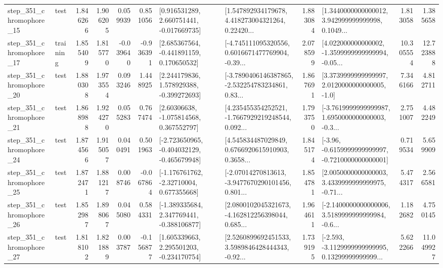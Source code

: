 \begin{tabular}{llrrrrllrlrr}
  step\_351\_chromophore\_15 &      test &      1.846266 &    1.906205 &      0.059939 &  0.851056 &    [0.916531289, 2.660751441, -0.017669735] &  [1.547892934179678, 4.418273004321264, 0.22420... &       1.883084 &  [1.3440000000000012, 3.942999999999998, 0.1049... &            1.813058 &          1.385658 \\
  step\_351\_chromophore\_17 &  training &      1.855409 &    1.815770 &     -0.039640 & -0.936391 &    [2.685367564, -0.441891159, 0.170650532] &  [-4.745111095320556, 0.6016671477769904, -0.39... &       2.078599 &  [4.022000000000002, -1.3599999999999994, -0.05... &           10.305554 &         12.723888 \\
  step\_351\_chromophore\_20 &      test &      1.880308 &    1.973554 &      0.093246 &  1.448925 &    [2.244179836, 1.578929388, -0.399272693] &  [-3.7890406146387865, -2.532254783234861, 0.83... &       1.867691 &     [3.3739999999999997, 2.0120000000000005, -1.0] &            7.346166 &          4.812711 \\
  step\_351\_chromophore\_21 &      test &      1.868988 &    1.924270 &      0.055283 &  0.767474 &     [2.60306638, -1.075814568, 0.367552797] &  [4.235455354252521, -1.7667929219248544, 0.092... &       1.793750 &  [-3.7619999999999987, 1.6950000000000003, -0.3... &            2.751007 &          4.482249 \\
  step\_351\_chromophore\_24 &      test &      1.874566 &    1.915057 &      0.040491 &  0.501963 &  [-2.723650965, -0.404032129, -0.465679948] &  [4.545834487029849, 0.6766920615910903, 0.3658... &       1.845174 &  [-3.96, -0.6159999999999997, -0.7210000000000001] &            0.719534 &          5.659909 \\
  step\_351\_chromophore\_25 &      test &      1.872471 &    1.881217 &      0.008746 & -0.067864 &    [-1.176761762, -2.32710004, 0.677355668] &  [-2.07014270813613, -3.9477670290101456, 0.801... &       1.854781 &  [2.0050000000000003, 3.4339999999999975, -0.71... &            5.474317 &          2.566581 \\
  step\_351\_chromophore\_26 &      test &      1.852987 &    1.898067 &      0.045080 &  0.584331 &   [-1.389335684, 2.347769441, -0.388106877] &  [2.0800102045321673, -4.162812256398044, 0.685... &       1.964611 &  [-2.1400000000000006, 3.5189999999999984, -0.6... &            1.182682 &          4.750145 \\
  step\_351\_chromophore\_27 &      test &      1.818102 &    1.821889 &      0.003787 & -0.156877 &    [1.605339663, 2.295501203, -0.234170754] &  [2.5260899692451533, 3.5989846428444343, -0.92... &       1.739195 &  [-2.593, -3.1129999999999995, 0.13299999999999... &            5.622266 &         11.049927 \\

\end{tabular}
